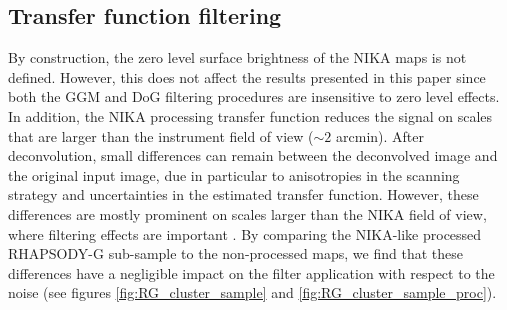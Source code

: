 \documentclass[twocolumn,traditabstract]{aa}
\begin{document}
\subsection{Transfer function filtering}\label{sec:Transfer_function_filtering}
By construction, the zero level surface brightness of the NIKA maps is not defined. However, this does not affect the results presented in this paper since both the GGM and DoG filtering procedures are insensitive to zero level effects. In addition, the NIKA processing transfer function reduces the signal on scales that are larger than the instrument field of view ($\sim 2$ arcmin). After deconvolution, small differences can remain between the deconvolved image and the original input image, due in particular to anisotropies in the scanning strategy and uncertainties in the estimated transfer function. However, these differences are mostly prominent on scales larger than the NIKA field of view, where filtering effects are important \citep{Adam2015}. By comparing the NIKA-like processed RHAPSODY-G sub-sample to the non-processed maps, we find that these differences have a negligible impact on the filter application with respect to the noise (see figures \ref{fig:RG_cluster_sample} and \ref{fig:RG_cluster_sample_proc}).

\end{document}
